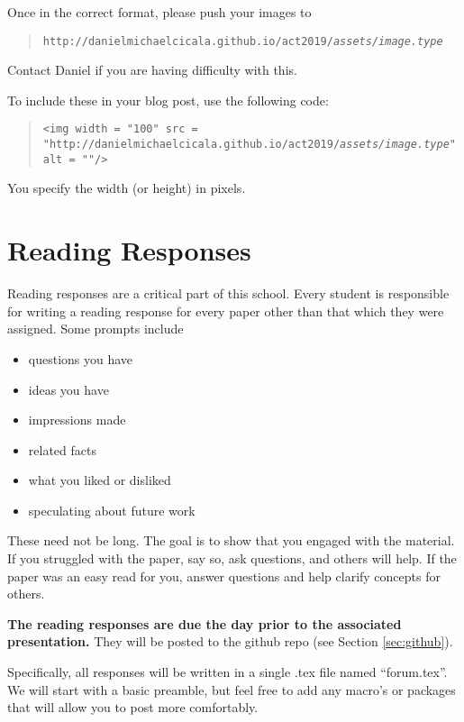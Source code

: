 \documentclass[11pt, oneside]{article}
\begin{document}
Once in the correct format, please push your images to
\begin{quote}
  \texttt{http://danielmichaelcicala.github.io/act2019/\emph{assets/image.type}}
\end{quote}
Contact Daniel if you are having difficulty with this.

To include these in your blog post, use the following code:
\begin{quote}
  \texttt{<img width = "100" src =
    "http://danielmichaelcicala.github.io/act2019/\emph{assets/image.type}"
    alt = ""/>}
\end{quote}
You specify the width (or height) in pixels.

\section{Reading Responses}
\label{sec:responses}

Reading responses are a critical part of this school. Every
student is responsible for writing a reading response for
every paper other than that which they were assigned.  Some
prompts include
\begin{multicols}{2}
  \begin{itemize}
  \item questions you have
  \item ideas you have
  \item impressions made
  \item related facts
  \item what you liked or disliked
  \item speculating about future work
  \end{itemize}
\end{multicols}

These need not be long. The goal is to show that you engaged
with the material. If you struggled with the paper, say so,
ask questions, and others will help.  If the paper was an
easy read for you, answer questions and help clarify
concepts for others.  

\textbf{The reading responses are due the day prior to the associated
presentation.} They will be posted to the github repo (see
Section \ref{sec:github}). 

Specifically, all responses will be written in a single .tex
file named ``forum.tex''. We will start with a basic preamble, but feel free to
add any macro's or packages that will allow you to post more
comfortably.
\end{document}
